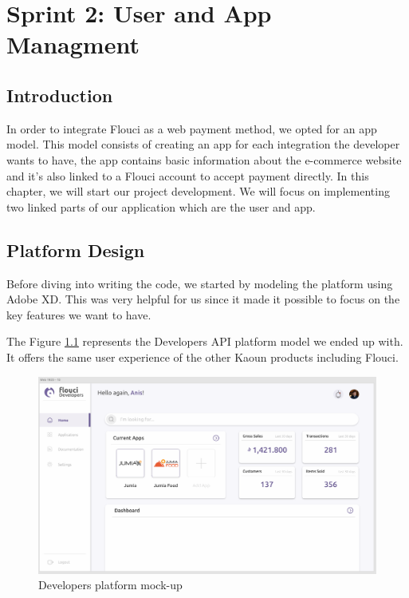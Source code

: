 
\setcounter{chapter}{3}
\chapter{Sprint 2: User and App Managment}
\minitoc %
\graphicspath{{Chapter4/figures/}}

\pagestyle{fancy}
\fancyhf{}
\fancyhead[R]{\bfseries\rightmark}
\fancyfoot[R]{\thepage}
\renewcommand{\headrulewidth}{0.5pt}
\renewcommand{\footrulewidth}{0pt}
\renewcommand{\chaptermark}[1]{\markboth{\MakeUppercase{\chaptername~\thechapter. #1 }}{}}
\renewcommand{\sectionmark}[1]{\markright{\thechapter.\thesection~ #1}}

\begin{spacing}{1.2}

\section*{Introduction}
In order to integrate Flouci as a web payment method, we opted for an app model. This model consists of creating an app for each integration the developer wants to have, the app contains basic information about the e-commerce website and it's also linked to a Flouci account to accept payment directly.
\newline
In this chapter, we will start our project development. We will focus on implementing two linked parts of our application which are the user and app. 

\section{Platform Design}
Before diving into writing the code, we started by modeling the platform using Adobe XD. This was very helpful for us since it made it possible to focus on the key features we want to have.

The Figure \ref{developersPlatform} represents the Developers API platform model we ended up with. It offers the same user experience of the other Kaoun products including Flouci.

\begin{figure}[H]\centering
\includegraphics[scale=0.4]{web_screen}
\caption{Developers platform mock-up}
\label{developersPlatform}
\end{figure}


\end{spacing}
